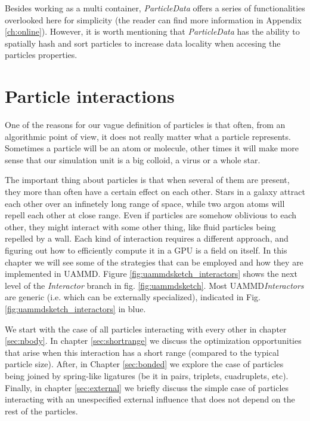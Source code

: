 \documentclass[ twoside,openright,titlepage,numbers=noenddot,%
headinclude,footinclude,cleardoublepage=empty,abstract=on,
BCOR=5mm,paper=a4,fontsize=11pt, dvipsnames
]{scrreprt}
\newcommand{\uammd}{\gls{UAMMD}\xspace}
\newcommand{\gpu}{\gls{GPU}\xspace}
\begin{document}
Besides working as a multi container, \emph{ParticleData} offers a series of functionalities overlooked here for simplicity (the reader can find more information in Appendix \ref{ch:online}). However, it is worth mentioning that \emph{ParticleData} has the ability to spatially hash and sort particles to increase data locality when accesing the particles properties.


\chapter{Particle interactions}\label{sec:interactions}

One of the reasons for our vague definition of particles is that often, from an algorithmic point of view, it does not really matter what a particle represents. Sometimes a particle will be an atom or molecule, other times it will make more sense that our simulation unit is a big colloid, a virus or a whole star.

The important thing about particles is that when several of them are present, they more than often have a certain effect on each other.
Stars in a galaxy attract each other over an infinetely long range of space, while two argon atoms will repell each other at close range.
Even if particles are somehow oblivious to each other, they might interact with some other thing, like fluid particles being repelled by a wall.
Each kind of interaction requires a different approach, and figuring out how to efficiently compute it in a \gpu is a field on itself. 
In this chapter we will see some of the strategies that can be employed and how they are implemented in \uammd. Figure \ref{fig:uammdsketch_interactors} shows the next level of the \emph{Interactor} branch in fig. \ref{fig:uammdsketch}.
Most \uammd \emph{Interactors} are generic (i.e. which can be externally specialized), indicated in Fig. \ref{fig:uammdsketch_interactors} in blue.

We start with the case of all particles interacting with every other in chapter \ref{sec:nbody}. In chapter \ref{sec:shortrange} we discuss the optimization opportunities that arise when this interaction has a short range (compared to the typical particle size). After, in Chapter \ref{sec:bonded} we explore the case of particles being joined by spring-like ligatures (be it in pairs, triplets, cuadruplets, etc). Finally, in chapter \ref{sec:external} we briefly discuss the simple case of particles interacting with an unespecified external influence that does not depend on the rest of the particles.
\end{document}
